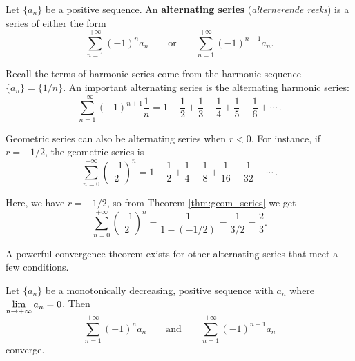 \begin{definition}\label{def:alt_series}
Let $\{a_n\}$ be a positive sequence. An \textbf{alternating series} (\textit{alternerende reeks}) is a series of either the form
$$\sum_{n=1}^{+\infty} (-1)^na_n\qquad \text{or}\qquad \sum_{n=1}^{+\infty} (-1)^{n+1}a_n.$$
\end{definition}

Recall the terms of harmonic series come from the harmonic sequence $\{a_n\} = \{1/n\}$. An important alternating series is the alternating harmonic series:
$$\sum_{n=1}^{+\infty} (-1)^{n+1}\frac1n = 1-\frac12+\frac13-\frac14+\frac15-\frac16+\cdots\,.$$

Geometric series can also be alternating series when $r<0$. For instance, if $r=-1/2$, the geometric series is
$$\sum_{n=0}^{+\infty} \left(\frac{-1}{2}\right)^n = 1-\frac12+\frac14-\frac18+\frac1{16}-\frac1{32}+\cdots\,.$$ 

Here, we have $r=-1/2$, so from Theorem \ref{thm:geom_series} we get
$$\sum_{n=0}^{+\infty} \left(\frac{-1}{2}\right)^n = \frac1{1-(-1/2)} = \frac 1{3/2} = \frac23.$$

A powerful convergence theorem exists for other alternating series that meet a few conditions.

\begin{theorem}\label{thm:alt_series_test}
Let $\{a_n\}$ be a monotonically decreasing, positive sequence with $a_n$ where $\displaystyle \lim_{n\to+\infty}a_n=0$. Then
$$\sum_{n=1}^{+\infty} (-1)^{n}a_n \qquad \text{and}\qquad \sum_{n=1}^{+\infty} (-1)^{n+1}a_n$$ converge.
\end{theorem}

\ifanalysis

